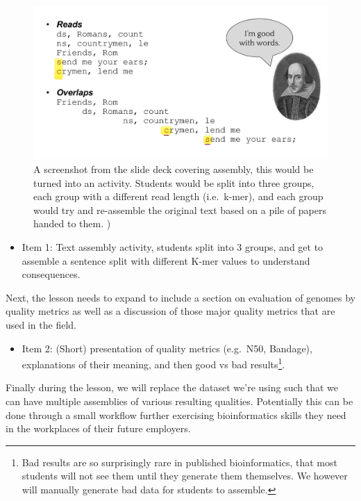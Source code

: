 \documentclass[paper=a4,justified,a4paper]{tufte-handout}
\providecommand{\tightlist}{%
  \setlength{\itemsep}{0pt}\setlength{\parskip}{0pt}}
\begin{document}
\begin{figure}
\centering
\includegraphics{./activity.png}
\caption{A screenshot from the slide deck covering assembly, this would
be turned into an activity. Students would be split into three groups,
each group with a different read length (i.e.~k-mer), and each group
would try and re-assemble the original text based on a pile of papers
handed to them. )\label{fig:activity}}
\end{figure}

\begin{itemize}
\tightlist
\item
  Item 1: Text assembly activity, students split into 3 groups, and get
  to assemble a sentence split with different K-mer values to understand
  consequences.
\end{itemize}

Next, the lesson needs to expand to include a section on evaluation of
genomes by quality metrics as well as a discussion of those major
quality metrics that are used in the field.

\begin{itemize}
\tightlist
\item
  Item 2: (Short) presentation of quality metrics (e.g.~N50, Bandage),
  explanations of their meaning, and then good vs bad results\footnote{Bad
    results are so surprisingly rare in published bioinformatics, that
    most students will not see them until they generate them themselves.
    We however will manually generate bad data for students to assemble.}.
\end{itemize}

Finally during the lesson, we will replace the dataset we're using such
that we can have multiple assemblies of various resulting qualities.
Potentially this can be done through a small workflow further exercising
bioinformatics skills they need in the workplaces of their future
employers.
\end{document}
